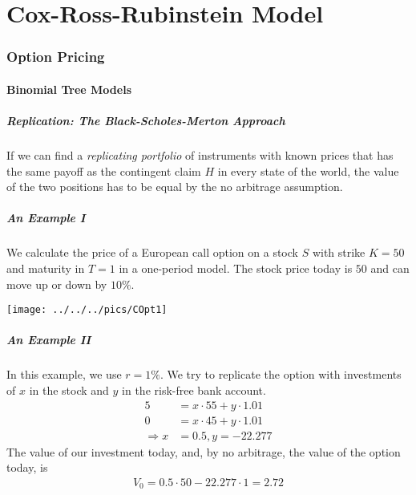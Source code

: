 \part{Cox-Ross-Rubinstein Model}

\section{Option Pricing}
\subsection{Binomial Tree Models}

\begin{frame}[fragile]
\frametitle{Replication: The Black-Scholes-Merton Approach}
If we can find a \emph{replicating portfolio} of instruments with known prices
that has the same payoff as the contingent claim $H$ in every state of the world, the value of the
two positions has to be equal by the no arbitrage assumption.
\end{frame}

\begin{frame}[fragile]
\frametitle{An Example I}
We calculate the price of a European call option on a stock $S$ with strike
$K=50$ and maturity in $T=1$ in a one-period model. The stock price today is
$50$ and can move up or down by $10\%$.

\center
\texttt{[image: ../../../pics/COpt1]}
\end{frame}

\begin{frame}[fragile]
\frametitle{An Example II}
In this example, we use $r=1\%$. We try to replicate the option with
investments of $x$ in the stock and $y$ in the risk-free bank account.
\begin{align*}
  5 &= x \cdot 55 + y \cdot 1.01 \\
  0 &= x \cdot 45 + y \cdot 1.01 \\
  \Rightarrow  x &= 0.5, y= -22.277
\end{align*}
The value of our investment today, and, by no arbitrage, the value of the option
today, is
\begin{align*}
  V_0 = 0.5 \cdot 50 -22.277 \cdot 1 = 2.72
\end{align*}
\end{frame}

